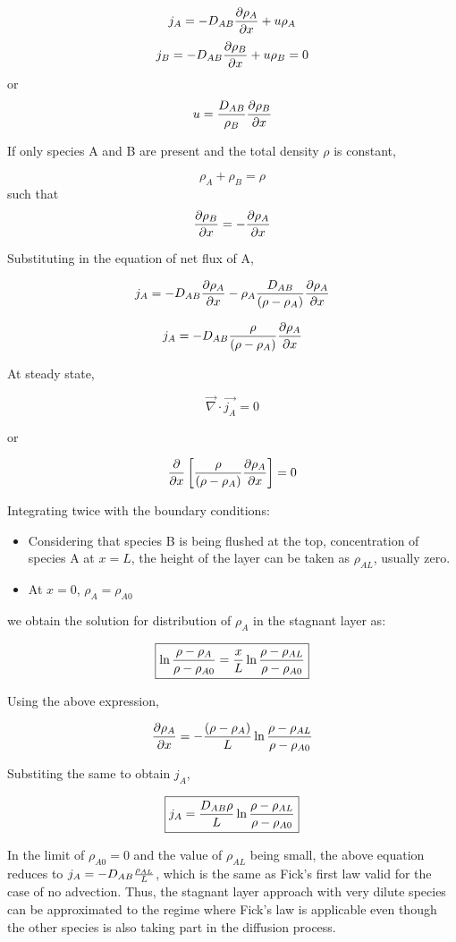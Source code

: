 $$ j_A = -D_{AB} {\partial \rho_A \over \partial x} + u \rho_A $$
$$ j_B = -D_{AB} {\partial \rho_B \over \partial x} + u \rho_B = 0$$
or
$$ u = { D_{AB} \over \rho_B} {\partial \rho_B \over \partial x}$$

If only species A and B are present and the total density $\rho$ is constant,

$$ \rho_A + \rho_B = \rho$$
such that 
$$ {\partial \rho_B \over \partial x} = - {\partial \rho_A \over \partial x}$$

Substituting in the equation of net flux of A,

$$ j_A = -D_{AB} {\partial \rho_A \over \partial x} - \rho_A {D_{AB} \over (\rho - \rho_A) }
{\partial \rho_A \over \partial x} $$

$$ j_A =  - D_{AB} {\rho \over (\rho - \rho_A)} {\partial \rho_A \over \partial x} $$

At steady state, 

$$ \vec{\nabla} \cdot {\vec{j_A}} = 0$$

or

$$ {\partial \over \partial x} \left[ {\rho \over (\rho - \rho_A)} {\partial \rho_A \over
\partial x} \right] = 0 $$

Integrating twice with the boundary conditions:

\begin{itemize}
\item Considering that species B is being flushed at the top, concentration of
species A at $x=L$, the height of the layer can be taken as $\rho_{AL}$, usually
zero. 
\item At $x=0$, $\rho_A = \rho_{A0}$
\end{itemize}

we obtain the solution for distribution of $\rho_A$ in the stagnant layer as:

$$ \boxed{
\ln {\rho - \rho_{A} \over \rho - \rho_{A0}} = {x \over L} \ln {\rho - \rho_{AL} \over \rho - \rho_{A0}}
}$$

Using the above expression,

$$ {\partial \rho_A \over \partial x} = - { (\rho - \rho_A) \over L } \ln {\rho - \rho_{AL}
\over \rho - \rho_{A0}} $$

Substiting the same to obtain $j_A$,

$$ \boxed{
j_A = {D_{AB} \rho \over L} \ln {\rho - \rho_{AL} \over \rho - \rho_{A0}} 
}$$

In the limit of $\rho_{A0} = 0$ and the value of $\rho_{AL}$ being small, the above
equation reduces to $j_A = -D_{AB} {\rho_{AL} \over L}$, which is the same as
Fick's first law valid for the case of no advection. Thus, the stagnant layer
approach with very dilute species can be approximated to the regime where Fick's
law is applicable even though the other species is also taking part in the
diffusion process.

